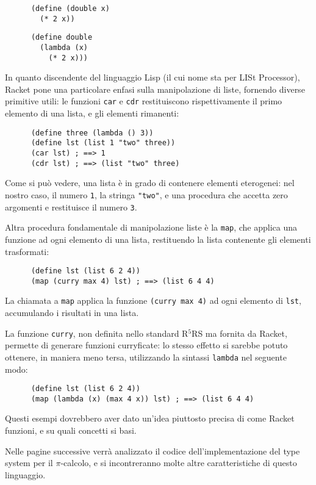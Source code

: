 \begin{lstlisting}
      (define (double x)
        (* 2 x))
\end{lstlisting}

\begin{lstlisting}
      (define double
        (lambda (x)
          (* 2 x)))
\end{lstlisting}

In quanto discendente del linguaggio Lisp (il cui nome sta per LISt
Processor), Racket pone una particolare enfasi sulla manipolazione di
liste, fornendo diverse primitive utili: le funzioni \lstinline{car} e
\lstinline{cdr} restituiscono rispettivamente il primo elemento di una
lista, e gli elementi rimanenti:

\begin{lstlisting}
      (define three (lambda () 3))
      (define lst (list 1 "two" three))
      (car lst) ; ==> 1
      (cdr lst) ; ==> (list "two" three)
\end{lstlisting}

Come si pu\`o vedere, una lista \`e in grado di contenere elementi
eterogenei: nel nostro caso, il numero \lstinline{1}, la stringa
\lstinline{"two"}, e una procedura che accetta zero argomenti e restituisce
il numero \lstinline{3}.

Altra procedura fondamentale di manipolazione liste \`e la \lstinline{map},
che applica una funzione ad ogni elemento di una lista, restituendo la
lista contenente gli elementi trasformati:

\begin{lstlisting}
      (define lst (list 6 2 4))
      (map (curry max 4) lst) ; ==> (list 6 4 4)
\end{lstlisting}

La chiamata a \lstinline{map} applica la funzione \lstinline{(curry max 4)}
ad ogni elemento di \lstinline{lst}, accumulando i risultati in una lista.

La funzione \lstinline{curry}, non definita nello standard R$^{5}$RS ma
fornita da Racket, permette di generare funzioni curryficate: lo stesso
effetto si sarebbe potuto ottenere, in maniera meno tersa, utilizzando la
sintassi \lstinline{lambda} nel seguente modo:

\begin{lstlisting}
      (define lst (list 6 2 4))
      (map (lambda (x) (max 4 x)) lst) ; ==> (list 6 4 4)
\end{lstlisting}

Questi esempi dovrebbero aver dato un'idea piuttosto precisa di come Racket
funzioni, e su quali concetti si basi.

Nelle pagine successive verr\`a analizzato il codice dell'implementazione
del type system per il $\pi$-calcolo, e si incontreranno molte altre
caratteristiche di questo linguaggio.
